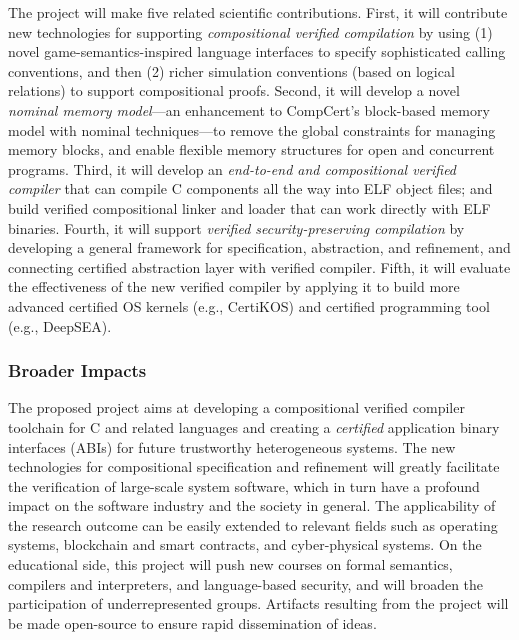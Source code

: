 The project will make five related scientific
contributions. First, it will contribute new technologies for supporting
{\em compositional verified compilation} by using (1) novel
game-semantics-inspired language interfaces to specify sophisticated
calling conventions, and then (2) richer simulation conventions (based
on logical relations) to support compositional proofs.  Second, it
will develop a novel {\em nominal memory model}---an enhancement to
CompCert's block-based memory model with nominal techniques---to
remove the global constraints for managing memory blocks, and enable
flexible memory structures for open and concurrent programs. Third, it
will develop an {\em end-to-end and compositional verified compiler}
that can compile C components all the way into ELF object files; and
build verified compositional linker and loader that can work directly
with ELF binaries.  Fourth, it will support {\em verified
security-preserving compilation} by developing a general framework for
specification, abstraction, and refinement, and connecting certified
abstraction layer with verified compiler. Fifth, it will evaluate the
effectiveness of the new verified compiler by applying it to build
more advanced certified OS kernels (e.g., CertiKOS) and certified
programming tool (e.g., DeepSEA).

\subsubsection*{Broader Impacts}

The proposed project aims at developing a compositional verified
compiler toolchain for C and related languages and creating a {\em
certified} application binary interfaces (ABIs) for future trustworthy
heterogeneous systems. The new technologies for compositional
specification and refinement will greatly facilitate the verification
of large-scale system software, which in turn have a profound impact
on the software industry and the society in general. The applicability
of the research outcome can be easily extended to relevant fields such
as operating systems, blockchain and smart contracts, and
cyber-physical systems.  On the educational side, this project will
push new courses on formal semantics, compilers and interpreters, and
language-based security, and will broaden the participation of
underrepresented groups.  Artifacts resulting from the project will be
made open-source to ensure rapid dissemination of ideas.

